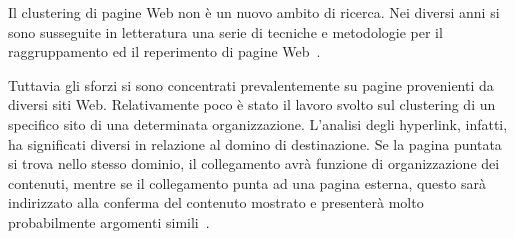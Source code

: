 


Il clustering di pagine Web non è un nuovo ambito di ricerca. Nei diversi anni si sono susseguite in letteratura una serie di tecniche e metodologie per il raggruppamento ed il reperimento di pagine Web~\cite{Banos03,Cooley03,Mobasher01,chiang15,Crescenzi05}. 

Tuttavia gli sforzi si sono concentrati prevalentemente su pagine provenienti da diversi siti Web. Relativamente poco è stato il lavoro svolto sul clustering di un specifico sito di una determinata organizzazione. L'analisi degli hyperlink, infatti, ha significati diversi in relazione al domino di destinazione. Se la pagina puntata si trova nello stesso dominio, il collegamento avrà funzione di organizzazione dei contenuti, mentre se il collegamento punta ad una pagina esterna, questo sarà indirizzato alla conferma del contenuto mostrato e presenterà molto probabilmente argomenti simili~\cite{}. 




